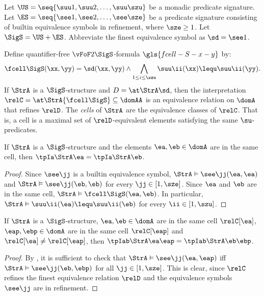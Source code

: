 
Let $\US = \seq{\suu1,\suu2,\dots,\suu\szu}$ be a monadic predicate signature.
Let $\ES = \seq{\see1,\see2,\dots,\see\sze}$ be a predicate signature consisting
of builtin equivalence symbols in refinement, where $\sze \geq 1$.
Let $\SigS = \US + \ES$.
Abbreviate the finest equivalence symbol as $\sd = \see1$.
\begin{definition}
Define quantifier-free $\vFoF2\SigS$-formula $\gls{fcell-S-x-y}$ by:
\[
  \fcell\SigS(\xx,\yy) = \sd(\xx,\yy) \land
  \bigwedge_{1 \leq i \leq \szu} \suu\ii(\xx) \lequ \suu\ii(\yy).
\]
If $\StrA$ is a $\SigS$-structure and $D = \at\StrA\sd$, then the
interpretation $\relC = \at\StrA{\fcell\SigS} \subseteq \domAA$ is an
equivalence relation on $\domA$ that refines $\relD$.
The \emph{cells} of $\StrA$ are the equivalence classes of $\relC$.
That is, a cell is a maximal set of $\relD$-equivalent elements satisfying the
same $\su$-predicates.
\end{definition}

\begin{remark}\label{rem:twovar-same-cell-tp1}
If $\StrA$ is a $\SigS$-structure and the elements $\ea, \eb \in \domA$ are in
the same cell, then $\tpIa\StrA\ea = \tpIa\StrA\eb$.
\end{remark}
\begin{proof}
Since $\see\jj$ is a builtin equivalence symbol,
$\StrA \vDash \see\jj(\ea,\ea)$ and $\StrA \vDash \see\jj(\eb,\eb)$
for every $\jj \in [1,\sze]$.
Since $\ea$ and $\eb$ are in the same cell,
$\StrA \vDash \fcell\SigS(\ea,\eb)$.
In particular, $\StrA \vDash \suu\ii(\ea) \lequ \suu\ii(\eb)$ for every
$\ii \in [1,\szu]$.
\end{proof}
\begin{remark}\label{rem:twovar-same-cell-tp2}
If $\StrA$ is a $\SigS$-structure, $\ea, \eb \in \domA$ are in the same cell
$\relC[\ea]$, $\eap, \ebp \in \domA$ are in the same cell $\relC[\eap]$ and
$\relC[\ea] \neq \relC[\eap]$,
then $\tpIab\StrA\ea\eap = \tpIab\StrA\eb\ebp$.
\end{remark}
\begin{proof}
By , it is sufficient to check that
$\StrA \vDash \see\jj(\ea, \eap)$ iff $\StrA \vDash \see\jj(\eb, \ebp)$
for all $\jj \in [1,\sze]$.
This is clear, since $\relC$ refines the finest equivalence relation $\relD$ and
the equivalence symbols $\see\jj$ are in refinement.
\end{proof}

